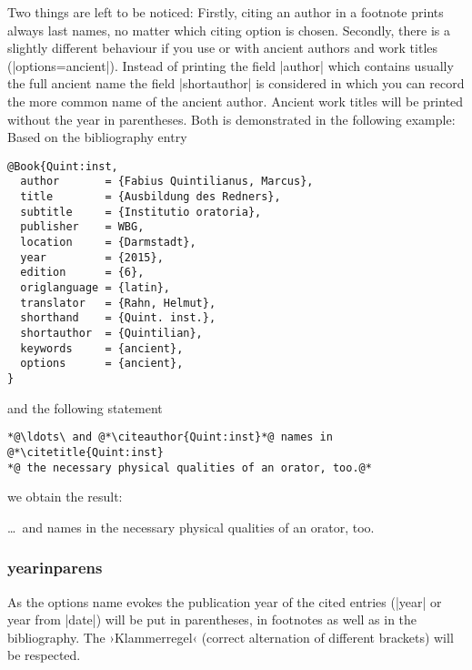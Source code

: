 \documentclass[a4paper,
10pt,
greek,
french,
spanish,
italian,
ngerman,
english
]{ltxdoc}
\begin{document}

Two things are left to be noticed: 
Firstly, citing an author in a footnote prints always last names, no matter which citing option is chosen. 
Secondly, there is a slightly different behaviour if you use   or   with ancient authors and work titles (|options={ancient}|).
Instead of printing the field |author| which contains usually the full ancient name the field |shortauthor| is considered in which you can record the more common name of the ancient author.
Ancient work titles will be printed without the year in parentheses. Both is demonstrated in the following example: Based on the bibliography entry

\begin{lstlisting}[style=bibentry,label=Quint:inst,caption={{@}Book\{Quint:inst,…\} }]
@Book{Quint:inst,
  author       = {Fabius Quintilianus, Marcus},
  title        = {Ausbildung des Redners},
  subtitle     = {Institutio oratoria},
  publisher    = WBG,
  location     = {Darmstadt},
  year         = {2015},
  edition      = {6},
  origlanguage = {latin},
  translator   = {Rahn, Helmut},
  shorthand    = {Quint. inst.},
  shortauthor  = {Quintilian},
  keywords     = {ancient},
  options      = {ancient},
}
\end{lstlisting}

and the following statement

\begin{refsection}
\begin{lstlisting}
*@\ldots\ and @*\citeauthor{Quint:inst}*@ names in @*\citetitle{Quint:inst} 
*@ the necessary physical qualities of an orator, too.@*
\end{lstlisting}
 
we obtain the result:

\begin{bsp}
\ldots\ and \citeauthor{Quint:inst} names in  the  necessary physical qualities of an orator, too.
\end{bsp}
\end{refsection}


\subsubsection{yearinparens}\label{yearinparens}
%
As the options name evokes the publication year of the cited entries (|year| or year from |date|) will be put in parentheses,
in footnotes as well as in the bibliography. 
The ›Klammerregel‹ (correct alternation of different brackets) will be respected.
\end{document}
